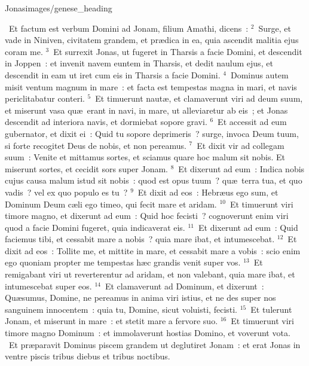 {Jonas}{images/genese_heading}

~\lettrine[lines=10,image=true,loversize=0.05,lraise=-0.03]{E}{}t factum est verbum Domini ad Jonam, filium Amathi, dicens~:
${}^{2}$~Surge, et vade in Niniven, civitatem grandem, et pr\ae dica in ea, quia ascendit malitia ejus coram me.
${}^{3}$~Et surrexit Jonas, ut fugeret in Tharsis a facie Domini, et descendit in Joppen~: et invenit navem euntem in Tharsis, et dedit naulum ejus, et descendit in eam ut iret cum eis in Tharsis a facie Domini.
${}^{4}$~Dominus autem misit ventum magnum in mare~: et facta est tempestas magna in mari, et navis periclitabatur conteri.
${}^{5}$~Et timuerunt naut\ae , et clamaverunt viri ad deum suum, et miserunt vasa qu\ae\ erant in navi, in mare, ut alleviaretur ab eis~; et Jonas descendit ad interiora navis, et dormiebat sopore gravi.
${}^{6}$~Et accessit ad eum gubernator, et dixit ei~: Quid tu sopore deprimeris~? surge, invoca Deum tuum, si forte recogitet Deus de nobis, et non pereamus.
${}^{7}$~Et dixit vir ad collegam suum~: Venite et mittamus sortes, et sciamus quare hoc malum sit nobis. Et miserunt sortes, et cecidit sors super Jonam.
${}^{8}$~Et dixerunt ad eum~: Indica nobis cujus causa malum istud sit nobis~: quod est opus tuum~? qu\ae\ terra tua, et quo vadis~? vel ex quo populo es tu~?
${}^{9}$~Et dixit ad eos~: Hebr\ae us ego sum, et Dominum Deum c\ae li ego timeo, qui fecit mare et aridam.
${}^{10}$~Et timuerunt viri timore magno, et dixerunt ad eum~: Quid hoc fecisti~? cognoverunt enim viri quod a facie Domini fugeret, quia indicaverat eis.
${}^{11}$~Et dixerunt ad eum~: Quid faciemus tibi, et cessabit mare a nobis~? quia mare ibat, et intumescebat.
${}^{12}$~Et dixit ad eos~: Tollite me, et mittite in mare, et cessabit mare a vobis~: scio enim ego quoniam propter me tempestas h\ae c grandis venit super vos.
${}^{13}$~Et remigabant viri ut reverterentur ad aridam, et non valebant, quia mare ibat, et intumescebat super eos.
${}^{14}$~Et clamaverunt ad Dominum, et dixerunt~: Qu\ae sumus, Domine, ne pereamus in anima viri istius, et ne des super nos sanguinem innocentem~: quia tu, Domine, sicut voluisti, fecisti.
${}^{15}$~Et tulerunt Jonam, et miserunt in mare~: et stetit mare a fervore suo.
${}^{16}$~Et timuerunt viri timore magno Dominum~: et immolaverunt hostias Domino, et voverunt vota.
~\lettrine[lines=10,image=true,loversize=0.05,lraise=-0.03]{E}{}t pr\ae paravit Dominus piscem grandem ut deglutiret Jonam~: et erat Jonas in ventre piscis tribus diebus et tribus noctibus.
